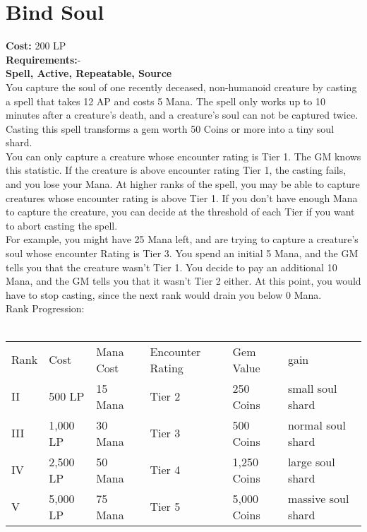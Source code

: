 \section{Bind Soul}\label{spell:bindSoul}
\textbf{Cost:} 200 LP\\
\textbf{Requirements:}-\\
\textbf{Spell, Active, Repeatable, Source}\\
You capture the soul of one recently deceased, non-humanoid creature by casting a spell that takes 12 AP and costs 5 Mana.
The spell only works up to 10 minutes after a creature's death, and a creature's soul can not be captured twice.
Casting this spell transforms a gem worth 50 Coins or more into a tiny soul shard.\\
You can only capture a creature whose encounter rating is Tier 1.
The GM knows this statistic.
If the creature is above encounter rating Tier 1, the casting fails, and you lose your Mana.
At higher ranks of the spell, you may be able to capture creatures whose encounter rating is above Tier 1.
If you don't have enough Mana to capture the creature, you can decide at the threshold of each Tier if you want to abort casting the spell.\\
For example, you might have 25 Mana left, and are trying to capture a creature's soul whose encounter Rating is Tier 3.
You spend an initial 5 Mana, and the GM tells you that the creature wasn't Tier 1.
You decide to pay an additional 10 Mana, and the GM tells you that it wasn't Tier 2 either.
At this point, you would have to stop casting, since the next rank would drain you below 0 Mana.
\\
Rank Progression:\\
\\
\begin{longtable}{l | l | l | l | l | l}
    Rank & Cost & Mana Cost & Encounter Rating & Gem Value & gain\\
    II & 500 LP& 15 Mana & Tier 2 & 250 Coins & small soul shard\\
    III & 1,000 LP & 30 Mana & Tier 3 & 500 Coins & normal soul shard\\
    IV & 2,500 LP & 50 Mana & Tier 4 & 1,250 Coins & large soul shard\\
    V & 5,000 LP & 75 Mana & Tier 5 & 5,000 Coins & massive soul shard\\
\end{longtable}